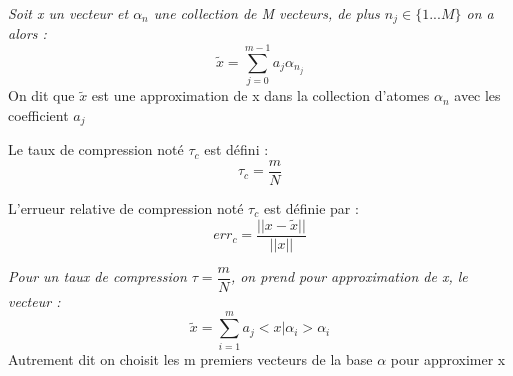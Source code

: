 \begin{defn}[Approximation]
\textit{Soit x un vecteur et $\alpha_{n}$ une collection de M vecteurs, de plus $n_{j}\in \lbrace 1 ... M \rbrace$ on a alors : }
$$\tilde{x}=\sum_{j=0}^{m-1}a_{j}\alpha_{n_{j}}$$
On dit que $\tilde{x}$ est une approximation de x dans la collection d'atomes $\alpha_{n}$ avec les coefficient $a_{j}$
\end{defn}

\begin{defn}
Le taux de compression noté $\tau_{c}$ est défini : 
$$\tau_{c}=\dfrac{m}{N}$$
\end{defn}

\begin{defn}
L'errueur relative de compression noté $\tau_{c}$ est définie par : 
$$err_{c}=\dfrac{||x-\tilde{x}||}{||x||}$$
\end{defn}

\begin{defn}
\textit{Pour un taux de compression $\tau=\dfrac{m}{N}$, on prend pour approximation de x, le vecteur  : }
$$\tilde{x}=\sum_{i=1}^{m}a_{j}<x|\alpha_{i} >\alpha_{i}$$
Autrement dit on choisit les m premiers vecteurs de la base $\alpha$ pour approximer x
\end{defn}